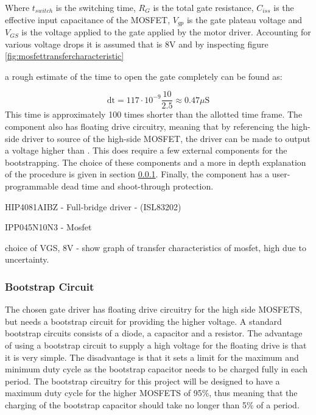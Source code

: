 Where $t_{switch}$ is the switching time, $R_G$ is the total gate resistance, $C_{iss}$ is the effective input capacitance of the
MOSFET, $V_{gp}$ is the gate plateau voltage and $V_{GS}$ is the voltage applied to the gate applied by the motor driver.
Accounting for various voltage drops it is assumed that \vgs is 8V and by inspecting figure \ref{fig:mosfettransfercharacteristic}





 a rough estimate of the time to open the gate completely can be found as:

\begin{equation}
	\text{dt} = 117\cdot10^{-9}\frac{10}{2.5}\approx0.47\mu\text{S}
\end{equation}
This time is approximately 100 times shorter than the allotted time frame.
The component also has floating drive circuitry, meaning that by referencing the high-side driver to source of the high-side MOSFET, the driver can be made to output a voltage higher than \vcc.
This does require a few external components for the bootstrapping.
The choice of these components and a more in depth explanation of the procedure is given in section \ref{ssub:bootstrap_circuit}.
Finally, the component has a user-programmable dead time and shoot-through protection. 

HIP4081AIBZ - Full-bridge driver - (ISL83202)

IPP045N10N3 - Mosfet

choice of VGS, 8V - show graph of transfer characteristics of mosfet, high due to uncertainty.

\subsubsection{Bootstrap Circuit}
\label{ssub:bootstrap_circuit}
The chosen gate driver has floating drive circuitry for the high side MOSFETS, but needs a bootstrap circuit for providing the higher voltage. 
A standard bootstrap circuits consists of a diode, a capacitor and a resistor. 
The advantage of using a bootstrap circuit to supply a high voltage for the floating drive is that it is very simple. 
The disadvantage is that it sets a limit for the maximum and minimum duty cycle as the bootstrap capacitor needs to be charged fully in each period.
The bootstrap circuitry for this project will be designed to have a maximum duty cycle for the higher MOSFETS of 95\%, thus meaning that the charging of the bootstrap capacitor should take no longer than 5\% of a period.  


